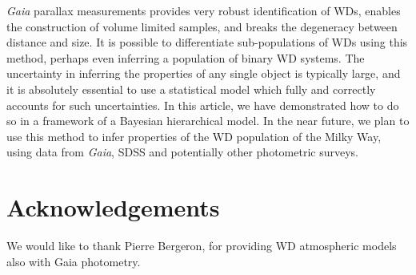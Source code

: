 \documentclass[fleqn,usenatbib]{mnras}
\begin{document}
\emph{Gaia} parallax measurements provides very robust identification of WDs, enables the construction of volume limited samples, and breaks the degeneracy between distance and size. It is possible to differentiate sub-populations of WDs using this method, perhaps even inferring a population of binary WD systems. The uncertainty in inferring the properties of any single object is typically large, and it is absolutely essential to use a statistical model which fully and correctly accounts for such uncertainties. In this article, we have demonstrated how to do so in a framework of a Bayesian hierarchical model. In the near future, we plan to use this method to infer properties of the WD population of the Milky Way, using data from \emph{Gaia}, SDSS and potentially other photometric surveys.



\section*{Acknowledgements}

We would like to thank Pierre Bergeron, for providing WD atmospheric models also with Gaia photometry.











\bsp	%
\label{lastpage}
\end{document}
